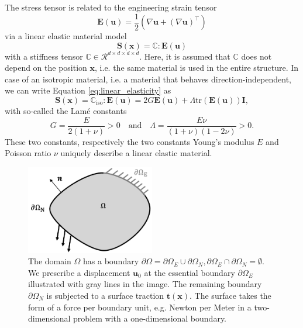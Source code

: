 The stress tensor is related to the engineering strain tensor 
\begin{equation}
    \mathbf{E}(\mathbf{u}) = \frac{1}{2} \left(\nabla \mathbf{u} + \left(\nabla \mathbf{u}\right)^\top \right)
    \label{eq:strain}
\end{equation} 
via a linear elastic material model 
\begin{equation}
    \mathbf{S}(\mathbf{x})  = \mathbb{C}  : \mathbf{E}(\mathbf{u}) 
    \label{eq:linear_elasticity}
\end{equation}
with a stiffness tensor $\mathbb{C}  \in \mathcal{R}^{d \times d \times d \times d}$. Here, it is assumed that $\mathbb{C}$ does not depend on the position $\mathbf{x}$, i.e. the same material is used in the entire structure. In case of an isotropic material, i.e. a material that behaves direction-independent, we can write Equation \eqref{eq:linear_elasticity} as
\begin{equation}
    \mathbf{S}(\mathbf{x}) = \mathbb{C}_\textrm{iso}  : \mathbf{E}(\mathbf{u})  =  2 G \mathbf{E}(\mathbf{u})  + \Lambda \textrm{tr}(\mathbf{E}(\mathbf{u}) ) \mathbf{I},
    \label{eq:isotropic_material}
\end{equation}
with so-called the Lamé constants 
\begin{equation}
    G = \frac{E}{2(1+\nu)} > 0 
    \quad \text{and} \quad 
    \Lambda = \frac{E\nu}{(1+\nu)(1-2\nu)} > 0 .
\end{equation} 
These two constants, respectively the two constants Young's modulus $E$ and Poisson ratio $\nu$ uniquely describe a linear elastic material. 

\begin{figure}[!htpb]
    \centering
    \includegraphics[width=0.5\textwidth]{figures/boundaries.png}
    \caption{The domain $\Omega$ has a boundary $\partial \Omega = \partial \Omega_E \cup \partial \Omega_N, \partial \Omega_E \cap \partial \Omega_N = \emptyset$. We prescribe a displacement $\mathbf{u}_0$ at the essential boundary $\partial \Omega_E$ illustrated with gray lines in the image. The remaining boundary $\partial \Omega_N$ is subjected to a surface traction $\mathbf{t}(\mathbf{x})$. The surface takes the form of a force per boundary unit, e.g. Newton per Meter in a two-dimensional problem with a one-dimensional boundary.}
    \label{fig:boundaries}
\end{figure}

